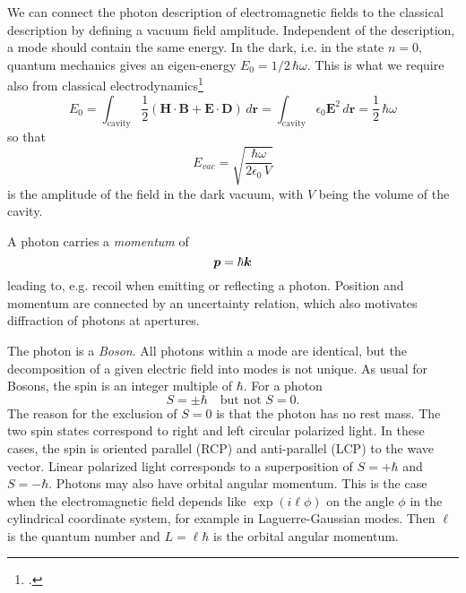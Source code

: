 We can connect the photon description of electromagnetic fields to the classical description by defining a vacuum field amplitude. Independent of the description, a mode should contain the same energy. In the dark, i.e. in the state $n=0$, quantum mechanics gives an eigen-energy $E_0 = 1/2 \,  \hbar \omega$. This is what we require also from classical electrodynamics\footcite[chap. 7.5]{Fox}
\begin{equation}
E_0 = 
 \int_\text{cavity} \frac{1}{2} 
 \left( \boldsymbol{H} \cdot  \boldsymbol{B} + \boldsymbol{E} \cdot  \boldsymbol{D} \right) \, d\boldsymbol{r} = 
  \int_\text{cavity}  \epsilon_0 \boldsymbol{E}^2 \, d\boldsymbol{r} = \frac{1}{2} \, \hbar \omega
\end{equation}
so that
\begin{equation}
E_{vac} = \sqrt{\frac{\hbar \omega}{2 \epsilon_0 \, V}} \label{eq:8_evac}
\end{equation}
is the amplitude of the field in the dark vacuum, with $V$ being the volume of the cavity. 

A photon carries a \emph{momentum} of 
\begin{equation}
    \boldsymbol{p} = \hbar \boldsymbol{k}
\end{equation}
leading to, e.g. recoil when emitting or reflecting a photon. Position and momentum are connected by an uncertainty relation, which also motivates diffraction of photons at apertures.

The photon is a \emph{Boson}. All photons within a mode are identical, but  the decomposition of a given electric field into modes is not unique. As usual for Bosons, the spin is an integer multiple of $\hbar$. For a photon
\begin{equation}
    S = \pm \hbar \quad \text{but not } S = 0. 
\end{equation}
The reason for the exclusion of $S=0$ is that the photon has no rest mass. The two spin states correspond to right and left circular polarized light. In these cases, the spin is oriented parallel (RCP) and anti-parallel (LCP) to the wave vector. Linear polarized light corresponds to a superposition of $S=+\hbar$ and $S=-\hbar$. Photons may also have orbital angular momentum. This is the case when the electromagnetic field depends like $\exp(i \ell \phi)$ on the angle $\phi$ in the cylindrical coordinate system, for example in Laguerre-Gaussian modes. Then $\ell$ is the quantum number and $L = \ell  \hbar$ is the orbital angular momentum.


